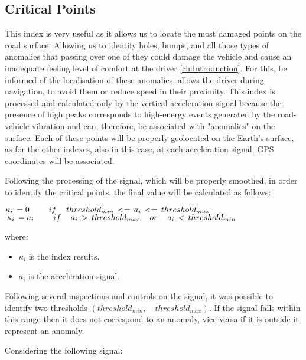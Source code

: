 \documentclass[tesi]{subfiles}
\begin{document}
\subsection{Critical Points}\label{ssc:Critical Points}
This index is very useful as it allows us to locate the most damaged points on the road surface.
Allowing us to identify holes, bumps, and all those types of anomalies that passing over one of they could damage the vehicle and cause an inadequate feeling level of comfort at the driver \ref{ch:Introduction}.
For this, be informed of the localisation of these anomalies,  allows the driver during navigation, to avoid them or reduce speed in their proximity.
This index is processed and calculated only by the vertical acceleration signal because the presence of high peaks corresponds to high-energy events generated by the road-vehicle vibration and can, therefore, be associated with "anomalies" on the surface.
Each of these points will be properly geolocated on the Earth's surface, as for the other indexes, also in this case, at each acceleration signal, GPS coordinates will be associated.	

Following the processing of the signal, which will be properly smoothed, in order to identify the critical points, the final value will be calculated as follows:

\begin{center}
${\large \kappa_{i} \thinspace = 0 \qquad	if \quad	threshold_{min} \thinspace <= \thinspace a_{i} \thinspace <= \thinspace threshold_{max}}$\\

${\large \thinspace \kappa_{i} \thinspace = a_{i} \qquad if \quad a_{i} \thinspace > \thinspace threshold_{max} \quad or \quad a_{i} \thinspace < \thinspace threshold_{min}}$
\end{center}

where:
\begin{itemize}
\item $\kappa_{i}$ is the index results.
\item $a_{i}$ is the acceleration signal.
\end{itemize} 
Following several inspections and controls on the signal, it was possible to identify two thresholds $\left(threshold_{min},\quad threshold_{max}\right)$.
If the signal falls within this range then it does not correspond to an anomaly, vice-versa if it is outside it, represent an anomaly.

\clearpage Considering the following signal:
\end{document}
